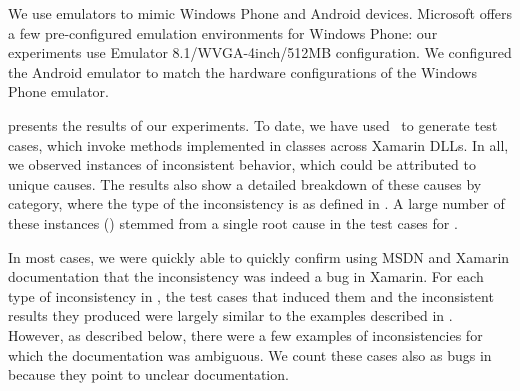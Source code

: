 We use emulators to mimic Windows Phone and Android devices. Microsoft offers a
few pre-configured emulation environments for Windows Phone: our experiments
use Emulator 8.1/WVGA-4inch/512MB configuration. We configured the Android
emulator to match the hardware configurations of the Windows Phone emulator.

%
 presents the results of our experiments.  To date,
we have used \tool\ to generate  test cases, which invoke
 methods implemented in  classes across
 Xamarin DLLs. In all, we observed  instances of
inconsistent behavior, which could be attributed to  unique causes.
The results also show a detailed breakdown of these causes by category, where
the type of the inconsistency is as defined in
. A large number of these instances
() stemmed from a single root cause in the test cases for
.

In most cases, we were quickly able to quickly confirm using MSDN and Xamarin
documentation that the inconsistency was indeed a bug in Xamarin. For each type
of inconsistency in , the test cases that
induced them and the inconsistent results they produced were largely similar to
the examples described in . However, as described
below, there were a few examples of inconsistencies for which the documentation
was ambiguous. We count these cases also as bugs in
 because they point to unclear documentation.

